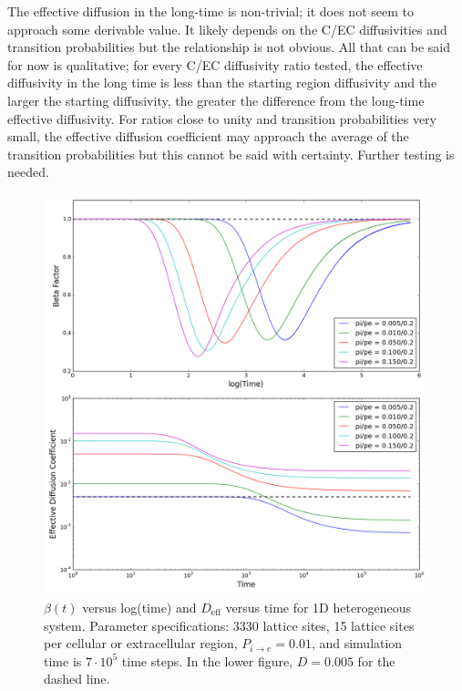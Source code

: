	The effective diffusion in the long-time is non-trivial; it does not seem to approach some derivable value. It likely depends on the C/EC diffusivities and transition probabilities but the relationship is not obvious. All that can be said for now is qualitative; for every C/EC diffusivity ratio tested, the effective diffusivity in the long time is less than the starting region diffusivity and the larger the starting diffusivity, the greater the difference from the long-time effective diffusivity. For ratios close to unity and transition probabilities very small, the effective diffusion coefficient may approach the average of the transition probabilities but this cannot be said with certainty. Further testing is needed.
	
	\begin{figure}[h!]
		\centering
		\includegraphics[width=1.0\linewidth]{../images/1D/pipe_beta_deff_1D}
		\caption{$ \beta (t) $ versus log(time) and $ D_\textrm{eff} $ versus time for 1D heterogeneous system. Parameter specifications: 3330 lattice sites, 15 lattice sites per cellular or extracellular region, $ P_{i \rightarrow e} = 0.01 $, and simulation time is $ 7\cdot 10^5 $ time steps. In the lower figure, $ D = 0.005 $ for the dashed line.}
		\label{fig:pipe_beta_deff_1D}
	\end{figure}

